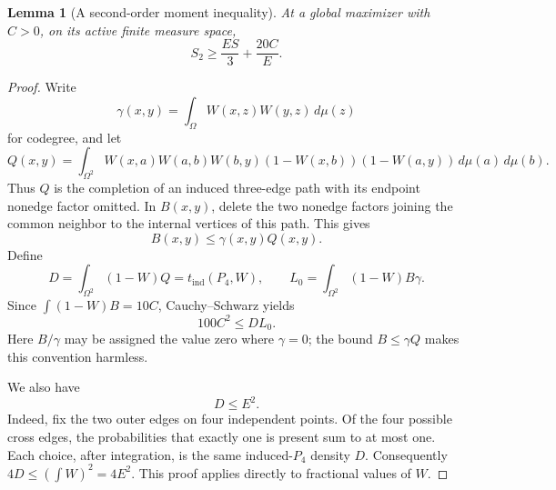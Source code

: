 \documentclass[11pt]{amsart}
\newtheorem{lemma}[theorem]{Lemma}
\theoremstyle{definition}
\theoremstyle{remark}
\begin{document}
\begin{lemma}[A second-order moment inequality]\label{lem:second-order-moment}
At a global maximizer with \(C>0\), on its active finite measure space,
\begin{equation}
 S_2\ge\frac{ES}{3}+\frac{20C}{E}.\tag{16}
\end{equation}
\end{lemma}
\begin{proof}
Write
\[
 \gamma(x,y)=\int_\Omega W(x,z)W(y,z)\,d\mu(z)
\]
for codegree, and let
\[
 Q(x,y)=\int_{\Omega^2}
 W(x,a)W(a,b)W(b,y)(1-W(x,b))(1-W(a,y))\,d\mu(a)\,d\mu(b).
\]
Thus \(Q\) is the completion of an induced three-edge path with its
endpoint nonedge factor omitted. In \(B(x,y)\), delete the two nonedge
factors joining the common neighbor to the internal vertices of this path.
This gives
\[
 B(x,y)\le\gamma(x,y)Q(x,y).
\]
Define
\[
 D=\int_{\Omega^2}(1-W)Q=t_{\mathrm{ind}}(P_4,W),\qquad
 L_0=\int_{\Omega^2}(1-W)B\gamma.
\]
Since \(\int(1-W)B=10C\), Cauchy--Schwarz yields
\begin{equation}
 100C^2\le DL_0.\tag{17}
\end{equation}
Here \(B/\gamma\) may be assigned the value zero where \(\gamma=0\);
the bound \(B\le\gamma Q\) makes this convention harmless.

We also have
\begin{equation}
 D\le E^2.\tag{18}
\end{equation}
Indeed, fix the two outer edges on four independent points. Of the four
possible cross edges, the probabilities that exactly one is present sum
to at most one. Each choice, after integration, is the same induced-\(P_4\)
density \(D\). Consequently \(4D\le(\int W)^2=4E^2\). This proof applies
directly to fractional values of \(W\).


\end{proof}
\end{document}
